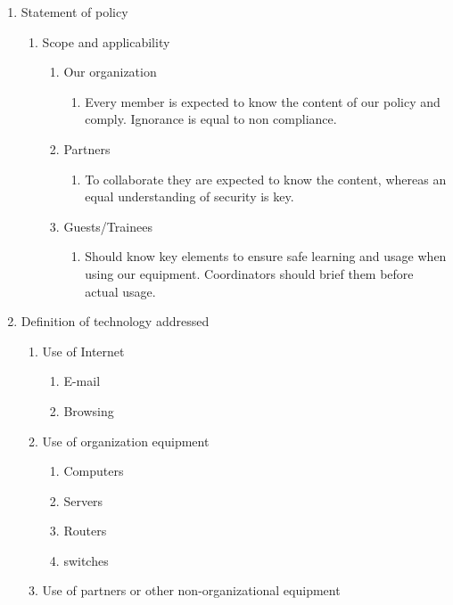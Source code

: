 \begin{enumerate}
  \item Statement of policy
  \begin{enumerate}
    \item Scope and applicability
    \begin{enumerate}
      \item Our organization
        \begin{enumerate}
          \item Every member is expected to know the content of our policy and comply. Ignorance is equal to non compliance.
        \end{enumerate}
          \item Partners
        \begin{enumerate}
          \item To collaborate they are expected to know the content, whereas an equal understanding of security is key.
        \end{enumerate}
          \item Guests/Trainees
        \begin{enumerate}
          \item Should know key elements to ensure safe learning and usage when using our equipment. Coordinators should brief them before actual usage.
        \end{enumerate}
    \end{enumerate}
  \end{enumerate}
  \item Definition of technology addressed
  \begin{enumerate}
    \item Use of Internet
    \begin{enumerate}   
      \item E-mail
      \item Browsing
    \end{enumerate}
    \item Use of organization equipment
    \begin{enumerate}
      \item Computers
      \item Servers
      \item Routers
      \item switches
    \end{enumerate}
    \item Use of partners or other non-organizational equipment
    \begin{enumerate}

\end{enumerate}
\end{enumerate}
\end{enumerate}
